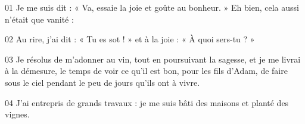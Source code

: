 01 Je me suis dit : « Va, essaie la joie et goûte au bonheur. » Eh bien, cela aussi n’était que vanité :

02 Au rire, j’ai dit : « Tu es sot ! » et à la joie : « À quoi sers-tu ? »

03 Je résolus de m’adonner au vin, tout en poursuivant la sagesse, et je me livrai à la démesure, le temps de voir ce qu’il est bon, pour les fils d’Adam, de faire sous le ciel pendant le peu de jours qu’ils ont à vivre.

04 J’ai entrepris de grands travaux : je me suis bâti des maisons et planté des vignes.
